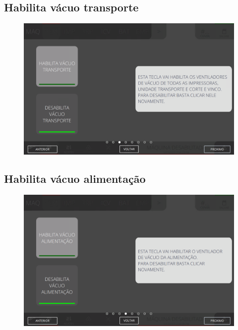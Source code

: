 \newpage
\thispagestyle{fancy}
\vspace*{40 pt}
\subsection{Habilita vácuo transporte}
\vspace*{\fill}
\begin{figure}[h]
    \centering
    \includegraphics[width=576 px,height=360 px]{src/imagesICV/03-feeder/commands/4.png}
\end{figure}
\vspace*{\fill}

\newpage
\thispagestyle{fancy}
\vspace*{40 pt}
\subsection{Habilita vácuo alimentação}
\vspace*{\fill}
\begin{figure}[h]
    \centering
    \includegraphics[width=576 px,height=360 px]{src/imagesICV/03-feeder/commands/5.png}
\end{figure}
\vspace*{\fill}

